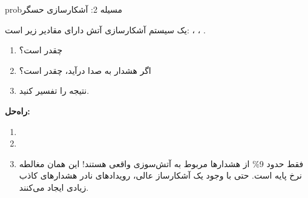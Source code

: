 \begin{PSbox}[unbreakable]{prob}{مسیله 2: آشکارسازی حسگر}

یک سیستم آشکارسازی آتش دارای مقادیر زیر است: ، ، .

\begin{enumerate}
\def\labelenumi{(\alph{enumi})}
\tightlist
\item
   چقدر است؟
\item
  اگر هشدار به صدا درآید،  چقدر است؟
\item
  نتیجه را تفسیر کنید.
\end{enumerate}

\textbf{راه‌حل:}

\begin{enumerate}
\def\labelenumi{(\alph{enumi})}
\item
  \PSbr{}
\item
  \PSbr{}
\item
  فقط حدود 9\% از هشدارها مربوط به آتش‌سوزی واقعی هستند! این همان مغالطه نرخ پایه است. حتی با وجود یک آشکارساز عالی، رویدادهای نادر هشدارهای کاذب زیادی ایجاد می‌کنند.
\end{enumerate}

\end{PSbox}

